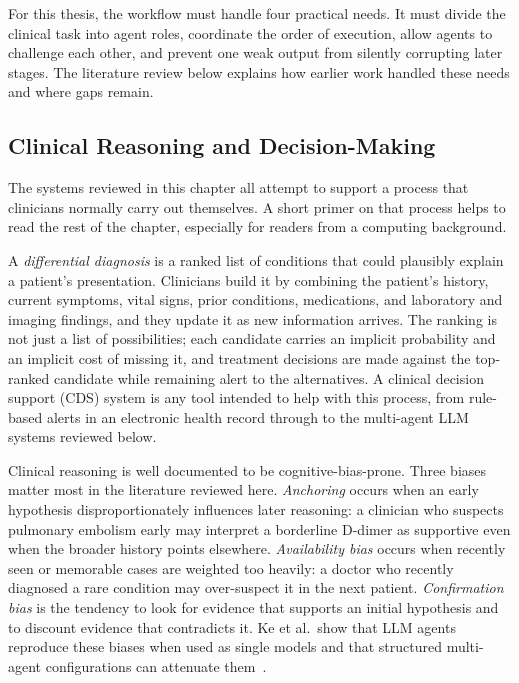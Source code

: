 For this thesis, the workflow must handle four practical needs. It must divide
the clinical task into agent roles, coordinate the order of execution, allow
agents to challenge each other, and prevent one weak output from silently
corrupting later stages. The literature review below explains how earlier work
handled these needs and where gaps remain.

\FloatBarrier
\subsection{Clinical Reasoning and Decision-Making}
\label{subsec:clinical_reasoning}

The systems reviewed in this chapter all attempt to support a process that
clinicians normally carry out themselves. A short primer on that process helps
to read the rest of the chapter, especially for readers from a computing
background.

A \emph{differential diagnosis} is a ranked list of conditions that could
plausibly explain a patient's presentation. Clinicians build it by combining
the patient's history, current symptoms, vital signs, prior conditions,
medications, and laboratory and imaging findings, and they update it as new
information arrives. The ranking is not just a list of possibilities; each
candidate carries an implicit probability and an implicit cost of missing it,
and treatment decisions are made against the top-ranked candidate while
remaining alert to the alternatives. A clinical decision support (CDS) system
is any tool intended to help with this process, from rule-based alerts in an
electronic health record through to the multi-agent LLM systems reviewed
below.

Clinical reasoning is well documented to be cognitive-bias-prone. Three biases
matter most in the literature reviewed here. \emph{Anchoring} occurs when an
early hypothesis disproportionately influences later reasoning: a clinician
who suspects pulmonary embolism early may interpret a borderline D-dimer as
supportive even when the broader history points elsewhere.
\emph{Availability bias} occurs when recently seen or memorable cases are
weighted too heavily: a doctor who recently diagnosed a rare condition may
over-suspect it in the next patient. \emph{Confirmation bias} is the tendency
to look for evidence that supports an initial hypothesis and to discount
evidence that contradicts it. Ke et al.\ show that LLM agents reproduce these
biases when used as single models and that structured multi-agent
configurations can attenuate them~\cite{Ke2024CognitiveBias}.

